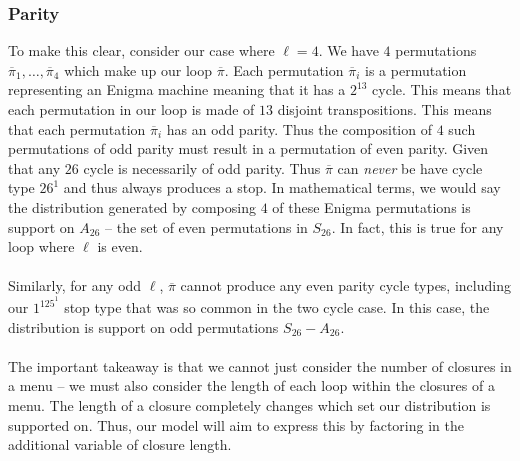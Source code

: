 \subsubsection{Parity}
To make this clear, consider our case where $\ell=4$. We have $4$ permutations $\overline\pi_1,\dots, \overline\pi_4$ which make up our loop $\overline\pi$. Each permutation $\overline\pi_i$ is a permutation representing an Enigma machine meaning that it has a $2^{13}$ cycle. This means that each permutation in our loop is made of $13$ disjoint transpositions. This means that each permutation $\overline\pi_i$ has an odd parity. Thus the composition of $4$ such permutations of odd parity must result in a permutation of even parity. Given that any $26$ cycle is necessarily of odd parity. Thus $\overline\pi$ can \emph{never} be have cycle type $26^1$ and thus always produces a stop. In mathematical terms, we would say the distribution generated by composing $4$ of these Enigma permutations is support on $A_{26}$ -- the set of even permutations in $S_{26}$. In fact, this is true for any loop where $\ell$ is even.
\\\\Similarly, for any odd $\ell$, $\overline\pi$ cannot produce any even parity cycle types, including our $1^125^1$ stop type that was so common in the two cycle case. In this case, the distribution is support on odd permutations $S_{26}-A_{26}$.
\\\\The important takeaway is that we cannot just consider the number of closures in a menu -- we must also consider the length of each loop within the closures of a menu. The length of a closure completely changes which set our distribution is supported on. Thus, our model will aim to express this by factoring in the additional variable of closure length.
